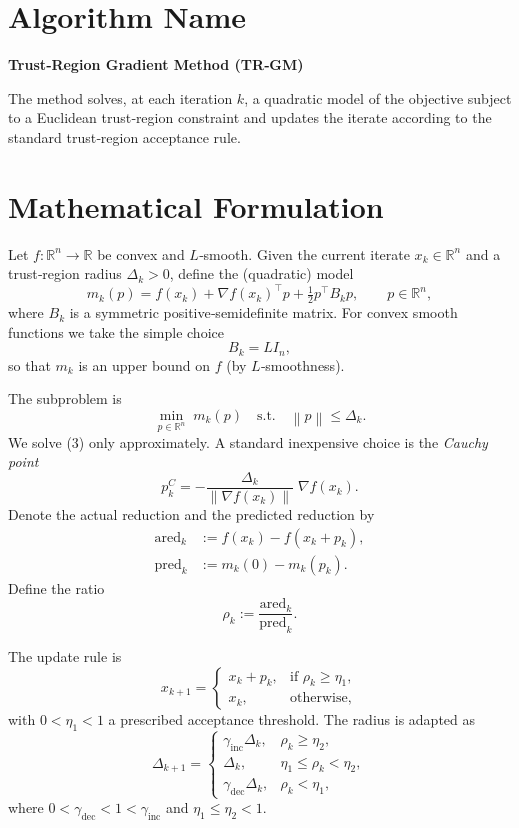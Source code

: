 \documentclass{article}
\newcommand{\norm}[1]{\left\lVert#1\right\rVert}
\newcommand{\R}{\mathbb{R}}
\begin{document}
\section*{Algorithm Name}
\textbf{Trust‑Region Gradient Method (TR‑GM)}  

The method solves, at each iteration $k$, a quadratic model of the objective
subject to a Euclidean trust‑region constraint and updates the iterate
according to the standard trust‑region acceptance rule.

\section*{Mathematical Formulation}
Let $f:\R^{n}\rightarrow\R$ be convex and $L$‑smooth.
Given the current iterate $x_{k}\in\R^{n}$ and a trust‑region radius
$\Delta_{k}>0$, define the (quadratic) model
\[
m_{k}(p)=f(x_{k})+\nabla f(x_{k})^{\top}p+\tfrac12 p^{\top}B_{k}p,
\qquad p\in\R^{n},
\tag{1}
\]
where $B_{k}$ is a symmetric positive‑semidefinite matrix.
For convex smooth functions we take the simple choice
\[
B_{k}=L I_{n},
\tag{2}
\]
so that $m_{k}$ is an upper bound on $f$ (by $L$‑smoothness).

The subproblem is
\[
\min_{p\in\R^{n}}\; m_{k}(p)\quad\text{s.t.}\quad \norm{p}\le\Delta_{k}.
\tag{3}
\]
We solve (3) only approximately.  A standard inexpensive choice is the
\emph{Cauchy point}
\[
p_{k}^{C}= -\frac{\Delta_{k}}{\norm{\nabla f(x_{k})}}\;\nabla f(x_{k}).
\tag{4}
\]
Denote the actual reduction and the predicted reduction by
\[
\begin{aligned}
\text{ared}_{k}&:=f(x_{k})-f(x_{k}+p_{k}),\\
\text{pred}_{k}&:=m_{k}(0)-m_{k}(p_{k}).
\end{aligned}
\tag{5}
\]
Define the ratio
\[
\rho_{k}:=\frac{\text{ared}_{k}}{\text{pred}_{k}}.
\tag{6}
\]

The update rule is
\[
x_{k+1}= \begin{cases}
x_{k}+p_{k}, & \text{if }\rho_{k}\ge\eta_{1},\\[4pt]
x_{k},      & \text{otherwise},
\end{cases}
\tag{7}
\]
with $0<\eta_{1}<1$ a prescribed acceptance threshold.
The radius is adapted as
\[
\Delta_{k+1}= \begin{cases}
\gamma_{\text{inc}}\Delta_{k}, & \rho_{k}\ge\eta_{2},\\[4pt]
\Delta_{k},                    & \eta_{1}\le\rho_{k}<\eta_{2},\\[4pt]
\gamma_{\text{dec}}\Delta_{k}, & \rho_{k}<\eta_{1},
\end{cases}
\tag{8}
\]
where $0<\gamma_{\text{dec}}<1<\gamma_{\text{inc}}$ and
$\eta_{1}\le\eta_{2}<1$.
\end{document}
